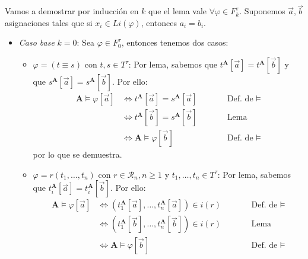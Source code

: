\documentclass{article}
\begin{document}
\vspace{0.35cm}
Vamos a demostrar por inducción en $k$ que el lema vale $\forall\varphi\in F_k^\tau$. Suponemos $\vec{a},\vec{b}$ asignaciones tales que si $x_i\in Li(\varphi)$, entonces $a_i=b_i$.
\begin{itemize}
  \item \textit{Caso base} $k=0$: Sea $\varphi\in F^\tau_0$, entonces tenemos dos casos:
        \begin{itemize}
          \item $\varphi=(t\equiv s)$ con $t,s\in T^\tau$: Por lema, sabemos que $t^\mathbf{A}[\vec{a}]=t^\mathbf{A}[\vec{b}]$ y que $s^\mathbf{A}[\vec{a}]=s^\mathbf{A}[\vec{b}]$. Por ello:
                \begin{equation*}
                  \begin{alignedat}{2}
                    \mathbf{A}\vDash\varphi[\vec{a}] & \iff t^\mathbf{A}[\vec{a}]=s^\mathbf{A}[\vec{a}] &  & \qquad\text{Def. de }\vDash \\
                                                     & \iff t^\mathbf{A}[\vec{b}]=s^\mathbf{A}[\vec{b}] &  & \qquad\text{Lema}           \\
                                                     & \iff \mathbf{A}\vDash\varphi[\vec{b}]            &  & \qquad\text{Def. de }\vDash
                  \end{alignedat}
                \end{equation*}
                por lo que se demuestra.
          \item $\varphi=r(t_1,\dots,t_n)$ con $r\in\mathcal{R}_n,n\geq 1$ y $t_1,\dots,t_n\in T^\tau$: Por lema, sabemos que $t_i^\mathbf{A}[\vec{a}]=t_i^\mathbf{A}[\vec{b}]$. Por ello:
                \begin{equation*}
                  \begin{alignedat}{2}
                    \mathbf{A}\vDash\varphi[\vec{a}] & \iff (t_1^\mathbf{A}[\vec{a}],\dots,t_n^\mathbf{A}[\vec{a}])\in i(r) &  & \qquad\text{Def. de }\vDash \\
                                                     & \iff (t_1^\mathbf{A}[\vec{b}],\dots,t_n^\mathbf{A}[\vec{b}])\in i(r) &  & \qquad\text{Lema}           \\
                                                     & \iff \mathbf{A}\vDash \varphi[\vec{b}]                               &  & \qquad\text{Def. de }\vDash
                  \end{alignedat}
                \end{equation*}

\end{itemize}
\end{itemize}
\end{document}
